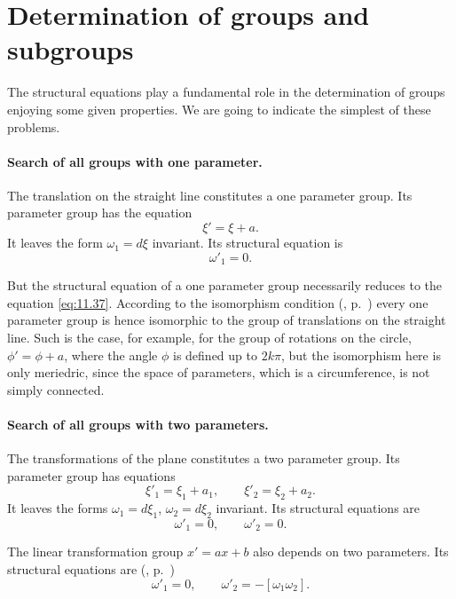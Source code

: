 \section{Determination of groups and subgroups}
\label{sec:determ-groups-subgr}

The structural equations play a fundamental role in the determination of groups enjoying some given properties. We are going to indicate the simplest of these problems.

\paragraph{Search of all groups with one parameter.}
\label{sec:167}
The translation on the straight line constitutes a one parameter group. Its parameter group has the equation
\[
\xi'=\xi+a.
\]
It leaves the form $\omega_{1}=d\xi$ invariant. Its structural equation is
\begin{equation}
  \label{eq:11.37}
  \omega'_{1}=0.
\end{equation}

But the structural equation of a one parameter group necessarily reduces to the equation \eqref{eq:11.37}. According to the isomorphism condition (, p.~\pageref{sec:164}) every one parameter group is hence isomorphic to the group of translations on the straight line. Such is the case, for example, for the group of rotations on the circle, $\phi'=\phi+a$, where the angle $\phi$ is defined up to $2k\pi$, but the isomorphism here is only meriedric, since the space of parameters, which is a circumference, is not simply connected.

\paragraph{Search of all groups with two parameters.}
\label{sec:168}
The transformations of the plane constitutes a two parameter group. Its parameter group has equations
\begin{equation}
  \label{eq:11.38}
  \xi'_{1}=\xi_{1}+a_{1},\qquad\xi'_{2}=\xi_{2}+a_{2}.
\end{equation}
It leaves the forms $\omega_{1}=d\xi_{1}$, $\omega_{2}=d\xi_{2}$ invariant. Its structural equations are
\begin{equation}
  \label{eq:11.39}
  \omega'_{1}=0,\qquad\omega'_{2}=0.
\end{equation}

The linear transformation group $x'=ax+b$ also depends on two parameters. Its structural equations are (, p.~\pageref{sec:158})
\begin{equation}
  \label{eq:11.40}
  \omega'_{1}=0,\qquad\omega'_{2}=-[\omega_{1}\omega_{2}].
\end{equation}

